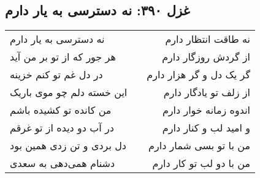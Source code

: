 \begin{center}
\section*{غزل ۳۹۰: نه دسترسی به یار دارم}
\label{sec:390}
\begin{longtable}{l p{0.5cm} r}
نه دسترسی به یار دارم
&&
نه طاقت انتظار دارم
\\
هر جور که از تو بر من آید
&&
از گردش روزگار دارم
\\
در دل غم تو کنم خزینه
&&
گر یک دل و گر هزار دارم
\\
این خسته دلم چو موی باریک
&&
از زلف تو یادگار دارم
\\
من کانده تو کشیده باشم
&&
اندوه زمانه خوار دارم
\\
در آب دو دیده از تو غرقم
&&
و امید لب و کنار دارم
\\
دل بردی و تن زدی همین بود
&&
من با تو بسی شمار دارم
\\
دشنام همی‌دهی به سعدی
&&
من با دو لب تو کار دارم
\\
\end{longtable}
\end{center}
